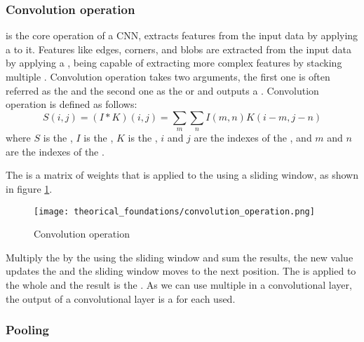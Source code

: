     \subsubsection{Convolution operation}

       is the core operation of a CNN, extracts features
      from the input data by applying a  to it\cite{goodfellow2016deep, intelligence2021modern}.
      Features like edges, corners, and blobs are extracted from the input data
      by applying a , being capable of extracting more complex
      features by stacking multiple \cite{goodfellow2016deep, intelligence2021modern}.
      Convolution operation takes two arguments, the first one is often referred as the
       and the second one as the  or  and outputs
      a .
      Convolution operation is defined as follows\cite{goodfellow2016deep}:
      \begin{equation}
        \label{eq:convolution_operation}
        S(i, j) = (I * K)(i, j) = \sum_{m} \sum_{n} I(m, n) K(i - m, j - n)
      \end{equation}
      where $S$ is the , $I$ is the , $K$ is the ,
      $i$ and $j$ are the indexes of the , and $m$ and $n$ are the
      indexes of the .

      The  is a matrix of weights that is applied to the 
      using a sliding window, as shown in figure \ref{fig:convolution_operation}.
      \begin{figure}[htbp]
        \centering
        \texttt{[image: theorical\_foundations/convolution\_operation.png]}
        \caption{Convolution operation}
        \label{fig:convolution_operation}
      \end{figure}
      Multiply the  by the  using the sliding window and
      sum the results, the new value updates the  and the sliding
      window moves to the next position. The  is applied to the whole
       and the result is the \cite{goodfellow2016deep, intelligence2021modern}.
      As we can use multiple  in a convolutional layer, the output
      of a convolutional layer is a  for each  used.

    \subsubsection{Pooling}

